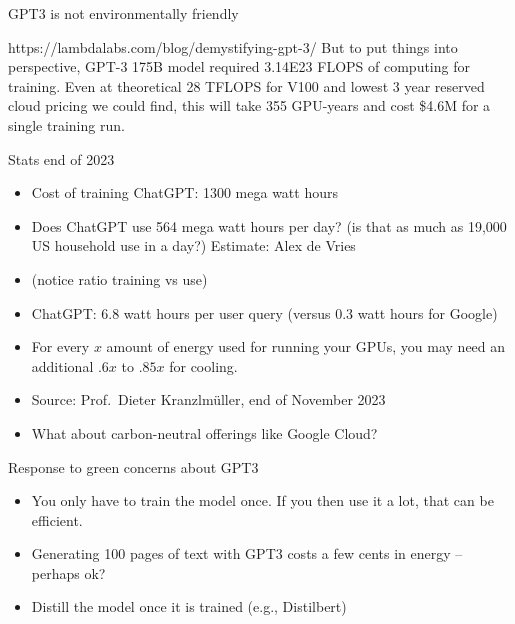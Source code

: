 
\begin{frame}{GPT3 is not environmentally friendly}

\vfill

  \begin{block}{https://lambdalabs.com/blog/demystifying-gpt-3/}
      But to put things into perspective, GPT-3 175B model
      required 3.14E23 FLOPS of computing for training. Even
      at theoretical 28 TFLOPS for V100 and lowest 3 year
      reserved cloud pricing we could find, this will take
      355 GPU-years and cost \$4.6M for a single training
      run.
  \end{block}

\vfill

\end{frame}

\begin{frame}{Stats end of 2023}

\vfill

\begin{itemize}
\item  Cost of training ChatGPT: 1300 mega watt hours
\item Does ChatGPT use 564 mega watt hours per day? (is that
      as much as 19,000 US household use in a day?)
      Estimate: Alex de Vries
\item (notice ratio training vs use)
\item ChatGPT: 6.8 watt hours per user query (versus 0.3
      watt hours for Google)
\item For every $x$ amount of energy used for running your
      GPUs, you may need an additional $.6x$ to $.85x$ for
      cooling.
\item Source: Prof.\ Dieter Kranzlm\"{u}ller, end of
      November 2023
      \item What about carbon-neutral offerings like Google Cloud?
\end{itemize}

\vfill

\end{frame}



\begin{frame}{Response to green concerns about GPT3}

\vfill

  \begin{itemize}
\item You only have to train the model once. If you
then use it a lot, that can be efficient.
\item Generating 100 pages of text with GPT3 costs a
few cents in energy -- perhaps ok?
\item Distill the model once it is trained (e.g., Distilbert)
    \end{itemize}
    
\vfill

\end{frame}

